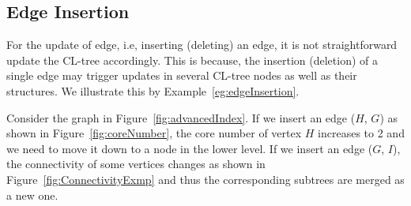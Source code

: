 \subsection{Edge Insertion}
\label{sec:edgeInsertion}

For the update of edge, i.e, inserting (deleting) an edge, it is not straightforward update the CL-tree accordingly. This is because, the insertion (deletion) of a single edge may trigger updates in several CL-tree nodes as well as their structures. We illustrate this by Example~\ref{eg:edgeInsertion}.

\begin{example}
\label{eg:edgeInsertion}
Consider the graph in Figure~\ref{fig:advancedIndex}. If we insert an edge ($H$, $G$) as shown in Figure~\ref{fig:coreNumber}, the core number of vertex $H$ increases to 2 and we need to move it down to a node in the lower level. If we insert an edge ($G$, $I$), the connectivity of some vertices changes as shown in Figure~\ref{fig:ConnectivityExmp} and thus the corresponding subtrees are merged as a new one.
\end{example}

